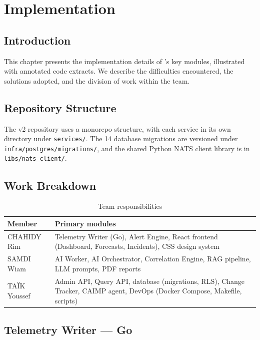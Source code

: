 \chapter{Implementation}

\section*{Introduction}

This chapter presents the implementation details of \caimp{}'s key modules,
illustrated with annotated code extracts. We describe the difficulties encountered,
the solutions adopted, and the division of work within the team.

\section{Repository Structure}

The \caimp{} v2 repository uses a monorepo structure, with each service in its
own directory under \texttt{services/}. The 14 database migrations are versioned
under \texttt{infra/postgres/migrations/}, and the shared Python NATS client
library is in \texttt{libs/nats\_client/}.

\section{Work Breakdown}

\begin{table}[H]
\centering
\caption{Team responsibilities}
\label{tab:team}
\small
\begin{tabularx}{\textwidth}{lX}
\toprule
\textbf{Member} & \textbf{Primary modules} \\
\midrule
CHAHIDY Rim  & Telemetry Writer (Go), Alert Engine, React frontend
               (Dashboard, Forecasts, Incidents), CSS design system \\
SAMDI Wiam   & AI Worker, AI Orchestrator, Correlation Engine,
               RAG pipeline, LLM prompts, PDF reports \\
TAÏK Youssef & Admin API, Query API, database (migrations, RLS),
               Change Tracker, CAIMP agent, DevOps (Docker Compose, Makefile, scripts) \\
\bottomrule
\end{tabularx}
\end{table}

\section{Telemetry Writer — Go}

